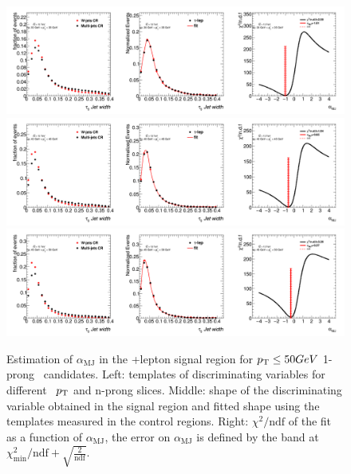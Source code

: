 	\begin{figure}
	\begin{center}
	\includegraphics[width=1\textwidth]{chapters/chapter6_HPlus/images/FFs/FFs_FIT_SR_TAULEP_1_30_35.png}
	\includegraphics[width=1\textwidth]{chapters/chapter6_HPlus/images/FFs/FFs_FIT_SR_TAULEP_1_40_45.png}
	\includegraphics[width=1\textwidth]{chapters/chapter6_HPlus/images/FFs/FFs_FIT_SR_TAULEP_1_45_50.png}
	\end{center}
	\caption{
	Estimation of $\alpha_\mathrm{MJ}$ in the \tauhad+lepton signal region for $p_{\text{T}} \leq 50 GeV$
	1-prong \tauhad\ candidates. Left: templates of discriminating variables for different \tauhad\ $p_{\text{T}}$
	and n-prong slices. Middle: shape of the discriminating variable obtained in the signal region and fitted
	shape using the templates measured in the control regions. Right: $\chi^2/\mathrm{ndf}$ of the fit as a
	function of $\alpha_\mathrm{MJ}$, the error on $\alpha_\mathrm{MJ}$ is defined by the band at
	$\chi^2_\mathrm{min}/\mathrm{ndf}+\sqrt{\frac{2}{\mathrm{ndf}}}$.
	}
	\label{fig:mm:Fits:region7_1}
	\end{figure}


